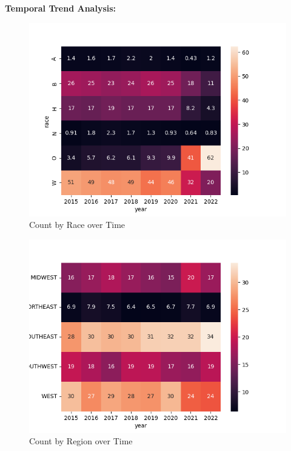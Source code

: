 \documentclass[12pt]{article}
\begin{document}
\begin{enumerate}[leftmargin=\labelsep]
  \textbf{Temporal Trend Analysis:}

  \begin{figure}[htb]
    \begin{center}
      \includegraphics[width=\textwidth]{media/Count_by_Race_over_Time.png}
    \end{center}
    \caption{Count by Race over Time}
    \label{fig:p2_count_by_race_time}
  \end{figure}

  \begin{figure}[htb]
    \begin{center}
      \includegraphics[width=\textwidth]{media/Count_by_Region_over_Time.png}
    \end{center}
    \caption{Count by Region over Time}
    \label{fig:p2_count_by_region_time}
  \end{figure}


\end{enumerate}
\end{document}
